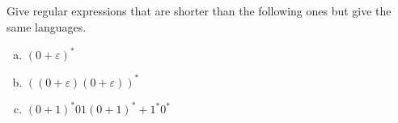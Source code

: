 \subsection{}

Give regular expressions that are shorter than the following ones but give the same languages.

\begin{enumerate}[a.)]
\item $(0+\varepsilon)^*$
\item $((0+\varepsilon)(0+\varepsilon))^*$
\item $(0+1)^*01(0+1)^*+1^*0^*$
\end{enumerate}